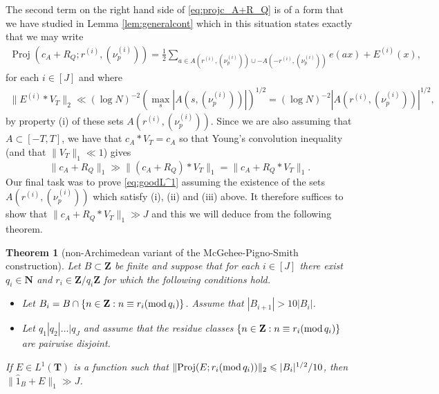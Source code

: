 \documentclass[11pt, reqno]{amsart}
\newtheorem{theorem}{Theorem}[section]
\newcommand{\mdlem}[1]{\ensuremath{(\mbox{\textup{mod}}\, #1)}}
\DeclareMathOperator{\Proj}{Proj}
\begin{document}
\medskip

The second term on the right hand side of \eqref{eq:projc_A+R_Q} is of a form that we have studied in Lemma \ref{lem:generalcont} which in this situation states exactly that we may write
\begin{align}\label{eq:niceprojc_A+R_Q}
    \Proj(c_A+R_Q;r^{(i)},(\nu_p^{(i)}))=\frac{1}{2}\sum_{a\in A(r^{(i)},(\nu_p^{(i)}))\cup-A(-r^{(i)},(\nu_p^{(i)}))}e(ax) + E^{(i)}(x),
\end{align} for each $i\in [J]$ and where 
\begin{align*}
    \lVert E^{(i)}*V_T\rVert_2\ll(\log N)^{-2}\left(\max_s|A(s,(\nu_p^{(i)}))|\right)^{1/2}=(\log N)^{-2}|A(r^{(i)},(\nu_p^{(i)}))|^{1/2},
\end{align*}
by property (i) of these sets $A(r^{(i)},(\nu_p^{(i)}))$. Since we are also assuming that $A\subset[-T,T]$, we have that $c_A*V_T=c_A$ so that Young's convolution inequality (and that $\lVert V_T\rVert_1\ll 1$) gives $$\lVert c_A+R_Q\rVert_1\gg \lVert (c_A+R_Q)*V_T\rVert_1=\lVert c_A+R_Q*V_T\rVert_1.$$  Our final task was to prove \eqref{eq:goodL^1} assuming the existence of the sets $A(r^{(i)},(\nu_p^{(i)}))$ which satisfy (i), (ii) and (iii) above. It therefore suffices to show that $\lVert c_A+R_Q*V_T\rVert_1\gg  J$ and this we will deduce from the following theorem.
\begin{theorem}[non-Archimedean variant of the McGehee-Pigno-Smith construction]
Let $B\subset \mathbf{Z}$ be finite and suppose that for each $i\in[J]$ there exist $q_i\in\mathbf{N}$ and $r_i\in\mathbf{Z}/q_i\mathbf{Z}$ for which the following conditions hold.
\begin{itemize}
    \item [(i)] Let $B_i=B\cap\{n\in\mathbf{Z}:n\equiv r_i\mdlem{q_i}\}$. Assume that $|B_{i+1}|>10|B_i|$.
    \item [(ii)] Let $q_1|q_2|\dots|q_J$ and assume that the residue classes $\{n\in\mathbf{Z}:n\equiv r_i\mdlem{q_i}\}$ are pairwise disjoint.
\end{itemize}
If $E\in L^1(\mathbf{T})$ is a function such that $\lVert \Proj(E; r_i\mdlem{q_i})\rVert_2\leqslant |B_i|^{1/2}/10$, then $\lVert \hat{1}_B+E\rVert_1\gg  J$.
\end{theorem}
\end{document}
